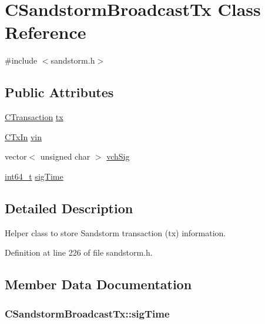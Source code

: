 \hypertarget{class_c_sandstorm_broadcast_tx}{}\section{C\+Sandstorm\+Broadcast\+Tx Class Reference}
\label{class_c_sandstorm_broadcast_tx}


{\ttfamily \#include $<$sandstorm.\+h$>$}

\subsection*{Public Attributes}
\begin{DoxyCompactItemize}
\item 
\hyperlink{class_c_transaction}{C\+Transaction} \hyperlink{class_c_sandstorm_broadcast_tx_ace6eee4d92b7fd4d98f8703d54d9b601}{tx}
\item 
\hyperlink{class_c_tx_in}{C\+Tx\+In} \hyperlink{class_c_sandstorm_broadcast_tx_a7aa70aaddcdcc0a56c84f2a6e43e96bd}{vin}
\item 
vector$<$ unsigned char $>$ \hyperlink{class_c_sandstorm_broadcast_tx_ad75aca79f3783c7f1e3f6a58f5ddc737}{vch\+Sig}
\item 
\hyperlink{stdint_8h_adec1df1b8b51cb32b77e5b86fff46471}{int64\+\_\+t} \hyperlink{class_c_sandstorm_broadcast_tx_af0add2ec08b732bff4cae62031a53061}{sig\+Time}
\end{DoxyCompactItemize}


\subsection{Detailed Description}
Helper class to store Sandstorm transaction (tx) information. 

Definition at line 226 of file sandstorm.\+h.



\subsection{Member Data Documentation}
\hypertarget{class_c_sandstorm_broadcast_tx_af0add2ec08b732bff4cae62031a53061}{}
\subsubsection[{sig\+Time}]{ C\+Sandstorm\+Broadcast\+Tx\+::sig\+Time}\label{class_c_sandstorm_broadcast_tx_af0add2ec08b732bff4cae62031a53061}


